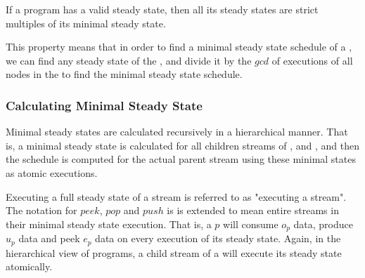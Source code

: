 \begin{theorem}
If a {\StreamIt} program has a valid steady state, then all its
steady states are strict multiples of its minimal steady state.
\label{thm:multiplicity}
\end{theorem}

\begin{comment}
\begin{proof}[Multiplicity of Minimal Steady State]
Assume that there exists a steady state that is not a multiple of
the minimal steady state.  Let $m$ denote the minimal steady
state. Let $q$ denote the other steady state.  Note that $w = q -
m$ is still a steady state, as long as all elements of $w$ remain
non-negative (by Corollary \ref{corollary:composition}).  Repeat
subtracting $m$ from $q$ until no more subtractions can be
performed without generating at least one negative element in
vector $w$.  Since $q$ is not a multiple of $m$, $w \ne 0$. But
since we cannot subtract $m$ from $w$ any further, $\exists i, m_i
> w_i$.  Since $m$ is a minimal steady state and $w$ is a steady
state, this is impossible due to Corollary
\ref{corollary:minimal-state}. Thus there are no steady states
that are not multiples of the minimal steady schedule.
\end{proof}
\end{comment}

This property means that in order to find a minimal steady state
schedule of a \stream, we can find any steady state of the
\stream, and divide it by the $gcd$ of executions of all nodes in
the \stream to find the minimal steady state schedule.

\subsubsection{Calculating Minimal Steady State}
\label{sec:calc-min-steady}

Minimal steady states are calculated recursively in a hierarchical
manner. That is, a minimal steady state is calculated for all
children streams of {\pipeline}, {\splitjoin} and {{\feedbackloop}},
and then the schedule is computed for the actual parent stream
using these minimal states as atomic executions.
\begin{comment}
This yields a minimal steady state
because all child streams must execute their steady states (to
avoid buffering changes), and all steady states are multiples of
the minimal steady states (per Theorem \ref{thm:multiplicity}).
\end{comment}
Executing a full steady state of a stream is referred to as
"executing a stream". The notation for $peek$, $pop$ and $push$ is
is extended to mean entire streams in their minimal steady state
execution.  That is, a {\pipeline} $p$ will consume $o_p$ data,
produce $u_p$ data and peek $e_p$ data on every execution of its
steady state.  Again, in the hierarchical view of {\StreamIt}
programs, a child stream of a {\pipeline} will execute its steady
state atomically.

